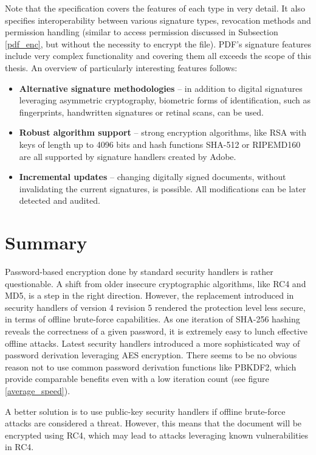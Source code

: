 \documentclass[11pt,oneside]{fithesis2}
\begin{document}
Note that the specification covers the features of each type in very detail. It also specifies interoperability between various signature types, revocation methods and permission handling (similar to access permission discussed in Subsection \ref{pdf_enc}, but without the necessity to encrypt the file). PDF's signature features include very complex functionality \cite{acrobat_dig_signatures} and covering them all exceeds the scope of this thesis. An overview of particularly interesting features follows:

\begin{itemize}
\setlength\itemsep{0.1em}
	\item{\textbf{Alternative signature methodologies} -- in addition to digital signatures leveraging asymmetric cryptography, biometric forms of identification, such as fingerprints, handwritten signatures or retinal scans, can be used.}
	\item{\textbf{Robust algorithm support} -- strong encryption algorithms, like RSA with keys of length up to 4096 bits and hash functions SHA-512 or RIPEMD160 are all supported by signature handlers created by Adobe.}
	\item{\textbf{Incremental updates} -- changing digitally signed documents, without invalidating the current signatures, is possible. All modifications can be later detected and audited.}
\end{itemize}

\section{Summary}\label{pdf_summ}

Password-based encryption done by standard security handlers is rather questionable. A shift from older insecure cryptographic algorithms, like RC4 and MD5, is a step in the right direction. However, the replacement introduced in security handlers of version 4 revision 5 rendered the protection level less secure, in terms of offline brute-force capabilities. As one iteration of SHA-256 hashing reveals the correctness of a given password, it is extremely easy to lunch effective offline attacks. Latest security handlers introduced a more sophisticated way of password derivation leveraging AES encryption. There seems to be no obvious reason not to use common password derivation functions like PBKDF2, which provide comparable benefits even with a low iteration count (see figure \ref{average_speed}). 

A better solution is to use public-key security handlers if offline brute-force attacks are considered a threat. However, this means that the document will be encrypted using RC4, which may lead to attacks leveraging known vulnerabilities in RC4. 
\end{document}
